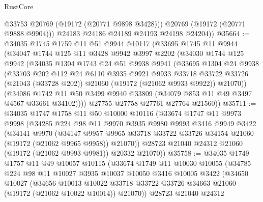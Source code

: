 \begin{lexlean}{RustCore}
\begin{coremodule}
            @33753
            @20769
            (@19172 (@20771 @9898 @3428)))
          @20769
          (@19172 (@20771 @9888 @9904)))
        @24183
        @24186
        @24189
        @24193
        @24198
        @24204))
@35664 := @34035
    @1745
    @1759
    @11
    @51
    @9944
    @10117
    (@33695
      @1745
      @11
      @9944
      (@34047
        @1744
        @125
        @11
        @3428
        @9942
        @3997
        @2202
        (@34030
          @1744
          @125
          @9942
          (@34035
            @1304
            @1743
            @24
            @51
            @9938
            @9941
            (@33695
              @1304
              @24
              @9938
              (@33703
                @202
                @112
                @24
                @6110
                @3935
                @9921
                @9933
                @33718
                @33722
                @33726
                (@21043 (@33728 @202))
                @21060
                (@19172 (@21062 @9933 @9922))
                @21070))
            (@34086
              @1742
              @11
              @50
              @3499
              @9940
              @33809
              (@34079 @853 @11 @49 @3497 @4567 @33661 @34102))))
        @27755
        @27758
        @27761
        @27764
        @21560))
@35711 := @34035
    @1747
    @1758
    @11
    @50
    @10000
    @10116
    (@33674
      @1747
      @11
      @9973
      @9998
      (@34285
        @224
        @98
        @11
        @9970
        @3935
        @9980
        @9993
        @3416
        @9949
        @3422
        (@34141
          @9970
          (@34147
            @9957
            @9965
            @33718
            @33722
            @33726
            @34154
            @21060
            (@19172 (@21062 @9965 @9958))
            @21070))
        @28723
        @21040
        @24312
        @21060
        (@19172 (@21062 @9993 @9981))
        @20332
        @21070))
@35758 := @34035
    @1749
    @1757
    @11
    @49
    @10057
    @10115
    (@33674
      @1749
      @11
      @10030
      @10055
      (@34785
        @224
        @98
        @11
        @10027
        @3935
        @10037
        @10050
        @3416
        @10005
        @3422
        (@34650
          @10027
          (@34656
            @10013
            @10022
            @33718
            @33722
            @33726
            @34663
            @21060
            (@19172 (@21062 @10022 @10014))
            @21070))
        @28723
        @21040
        @24312

\end{coremodule}
\end{lexlean}

